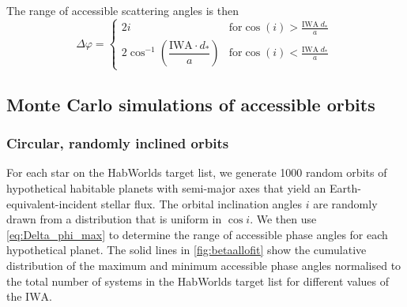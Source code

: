 \documentclass[usenatbib]{mnras}
\newcommand{\IWA}{\ensuremath{\mathrm{IWA}}\xspace}
\newcommand{\HWO}{HabWorlds\xspace}
\begin{document}

The range of accessible scattering angles is then 
\begin{equation}
\label{eq:Delta_phi_max}
    \Delta \varphi = 
    \begin{cases}
        2 i & \textrm{for} \cos(i) > \frac{\mathrm{IWA}\; d_* }{a} \\ 
        2 \cos^{-1}\left(\dfrac{\mathrm{IWA}\cdot d_* }{a}\right) & \textrm{for} \cos(i) < \frac{\mathrm{IWA}\; d_* }{a}
    \end{cases} \,
\end{equation}

\subsection{Monte Carlo simulations of accessible orbits}
\label{subsec:2.3}

\subsubsection{Circular, randomly inclined orbits}
\label{sec:circular}

For each star on the \HWO target list, we generate \num{1000} random orbits of hypothetical habitable planets with semi-major axes that yield an Earth-equivalent-incident stellar flux. 
The orbital inclination angles $i$ are randomly drawn from a distribution that is uniform in $\cos i$. 
We then use \cref{eq:Delta_phi_max} to determine the range of accessible phase angles for each hypothetical planet.
The solid lines in \cref{fig:betaallofit} show the cumulative distribution of the maximum and minimum accessible phase angles normalised to the total number of systems in the \HWO target list for different values of the \IWA.
\end{document}
